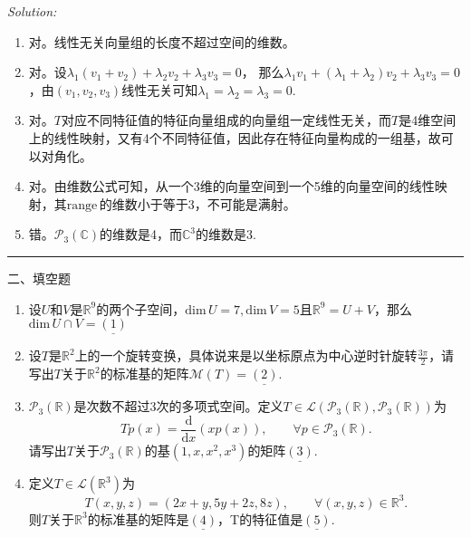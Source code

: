 \documentclass[a4[paper]{article}
\newcommand\R{\mathbb{R}}  %
\def\dim{\mathrm{dim}\,}
\def\range{\mathrm{range}\,}
\def\sep{\bigskip
\noindent{}\rule{\textwidth}{0.1mm}
\bigskip}
\begin{document}
\smallskip

\noindent{}\emph{Solution:}
\begin{enumerate}[1.]
\item 对。线性无关向量组的长度不超过空间的维数。
\item 对。设$\lambda_1(v_1+v_2)+\lambda_2 v_2+\lambda_3 v_3=0$， 那么$\lambda_1 v_1 +(\lambda_1+\lambda_2)v_2 +\lambda_3v_3=0$，由$(v_1,v_2,v_3)$线性无关可知$\lambda_1=\lambda_2=\lambda_3=0$.
\item 对。$T$对应不同特征值的特征向量组成的向量组一定线性无关，而$T$是4维空间上的线性映射，又有4个不同特征值，因此存在特征向量构成的一组基，故可以对角化。
\item 对。由维数公式可知，从一个3维的向量空间到一个5维的向量空间的线性映射，其$\range$的维数小于等于3，不可能是满射。
\item 错。$\mathcal{P}_3(\mathbb{C})$的维数是4，而$\mathbb{C}^3$的维数是3.
\end{enumerate}

\sep

\noindent{}二、填空题
\begin{enumerate}[1.]
\item 设$U$和$V$是$\R^9$的两个子空间，$\dim U=7,\dim V=5$且$\R^9=U+V$，那么$\dim U\cap V= \underline{(1)}$
\item 设$T$是$\R^2$上的一个旋转变换，具体说来是以坐标原点为中心逆时针旋转$\frac{3\pi}{2}$，请写出$T$关于$\R^2$的标准基的矩阵$\mathcal{M}(T)=\underline{(2)}$.
\item $\mathcal{P}_3(\R)$是次数不超过3次的多项式空间。定义$T\in\mathcal{L}(\mathcal{P}_3(\R),\mathcal{P}_3(\R))$为
\[Tp(x)=\frac{\mathrm{d}}{\mathrm{d}x}(xp(x)),\qquad\forall p \in \mathcal{P}_3(\R).\]
请写出$T$关于$\mathcal{P}_3(\R)$的基$(1,x,x^2,x^3)$的矩阵$\underline{(3)}$.
\item 定义$T\in\mathcal{L}(\R^3)$为
\[T(x,y,z)=(2x+y,5y+2z,8z),\qquad\forall (x,y,z)\in \R^3.\]
则$T$关于$\R^3$的标准基的矩阵是$\underline{(4)}$，T的特征值是$\underline{(5)}$.
\end{enumerate}

\smallskip
\end{document}
